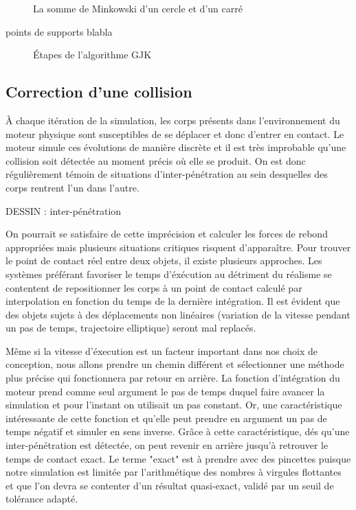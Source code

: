\begin{figure}
  \caption{La somme de Minkowski d'un cercle et d'un carré}
\end{figure}

points de supports blabla

\begin{figure}
  
  \caption{{\'E}tapes de l'algorithme GJK}
\end{figure}

\subsection{Correction d'une collision}

\`A chaque itération de la simulation, les corps présents dans
l'environnement du moteur physique sont susceptibles de se déplacer et
donc d'entrer en contact. Le moteur simule ces évolutions de manière
discrète et il est très improbable qu'une collision soit détectée au
moment précis o\`u elle se produit. On est donc régulièrement témoin
de situations d'inter-pénétration au sein desquelles des corps
rentrent l'un dans l'autre.

DESSIN : inter-pénétration

On pourrait se satisfaire de cette imprécision et calculer les forces
de rebond appropriées mais plusieurs situations critiques risquent
d'apparaître. Pour trouver le point de contact réel entre deux objets,
il existe plusieurs approches. Les systèmes préférant favoriser le
temps d'éxécution au détriment du réalisme se contentent de
repositionner les corps à un point de contact calculé par
interpolation en fonction du temps de la dernière intégration. Il est
évident que des objets sujets à des déplacements non linéaires
(variation de la vitesse pendant un pas de temps, trajectoire
elliptique) seront mal replacés.

Même si la vitesse d'éxecution est un facteur important dans nos choix
de conception, nous allons prendre un chemin différent et sélectionner
une méthode plus précise qui fonctionnera par retour en arrière. La
fonction d'intégration du moteur prend comme seul argument le pas de
temps duquel faire avancer la simulation et pour l'instant on
utilisait un pas constant. Or, une caractéristique intéressante de
cette fonction et qu'elle peut prendre en argument un pas de temps
négatif et simuler en sens inverse. Grâce à cette caractéristique, dés
qu'une inter-pénétration est détectée, on peut revenir en arrière
jusqu'à retrouver le temps de contact exact. Le terme "exact" est à
prendre avec des pincettes puisque notre simulation est limitée par
l'arithmétique des nombres à virgules flottantes et que l'on devra se
contenter d'un résultat quasi-exact, validé par un seuil de tolérance
adapté.

